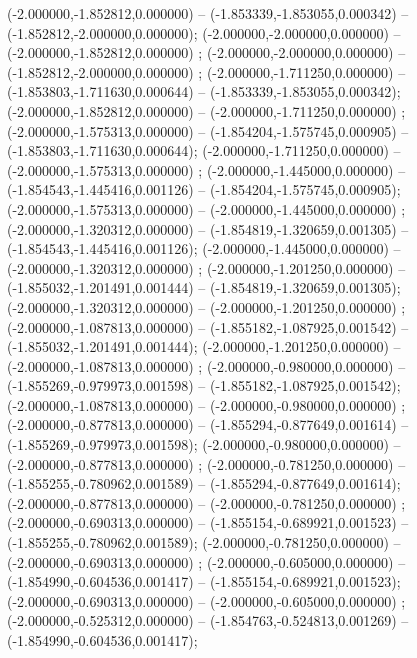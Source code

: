  (-2.000000,-1.852812,0.000000) -- (-1.853339,-1.853055,0.000342) -- (-1.852812,-2.000000,0.000000);
 (-2.000000,-2.000000,0.000000) -- (-2.000000,-1.852812,0.000000) ;
 (-2.000000,-2.000000,0.000000) -- (-1.852812,-2.000000,0.000000) ;
 (-2.000000,-1.711250,0.000000) -- (-1.853803,-1.711630,0.000644) -- (-1.853339,-1.853055,0.000342);
 (-2.000000,-1.852812,0.000000) -- (-2.000000,-1.711250,0.000000) ;
 (-2.000000,-1.575313,0.000000) -- (-1.854204,-1.575745,0.000905) -- (-1.853803,-1.711630,0.000644);
 (-2.000000,-1.711250,0.000000) -- (-2.000000,-1.575313,0.000000) ;
 (-2.000000,-1.445000,0.000000) -- (-1.854543,-1.445416,0.001126) -- (-1.854204,-1.575745,0.000905);
 (-2.000000,-1.575313,0.000000) -- (-2.000000,-1.445000,0.000000) ;
 (-2.000000,-1.320312,0.000000) -- (-1.854819,-1.320659,0.001305) -- (-1.854543,-1.445416,0.001126);
 (-2.000000,-1.445000,0.000000) -- (-2.000000,-1.320312,0.000000) ;
 (-2.000000,-1.201250,0.000000) -- (-1.855032,-1.201491,0.001444) -- (-1.854819,-1.320659,0.001305);
 (-2.000000,-1.320312,0.000000) -- (-2.000000,-1.201250,0.000000) ;
 (-2.000000,-1.087813,0.000000) -- (-1.855182,-1.087925,0.001542) -- (-1.855032,-1.201491,0.001444);
 (-2.000000,-1.201250,0.000000) -- (-2.000000,-1.087813,0.000000) ;
 (-2.000000,-0.980000,0.000000) -- (-1.855269,-0.979973,0.001598) -- (-1.855182,-1.087925,0.001542);
 (-2.000000,-1.087813,0.000000) -- (-2.000000,-0.980000,0.000000) ;
 (-2.000000,-0.877813,0.000000) -- (-1.855294,-0.877649,0.001614) -- (-1.855269,-0.979973,0.001598);
 (-2.000000,-0.980000,0.000000) -- (-2.000000,-0.877813,0.000000) ;
 (-2.000000,-0.781250,0.000000) -- (-1.855255,-0.780962,0.001589) -- (-1.855294,-0.877649,0.001614);
 (-2.000000,-0.877813,0.000000) -- (-2.000000,-0.781250,0.000000) ;
 (-2.000000,-0.690313,0.000000) -- (-1.855154,-0.689921,0.001523) -- (-1.855255,-0.780962,0.001589);
 (-2.000000,-0.781250,0.000000) -- (-2.000000,-0.690313,0.000000) ;
 (-2.000000,-0.605000,0.000000) -- (-1.854990,-0.604536,0.001417) -- (-1.855154,-0.689921,0.001523);
 (-2.000000,-0.690313,0.000000) -- (-2.000000,-0.605000,0.000000) ;
 (-2.000000,-0.525312,0.000000) -- (-1.854763,-0.524813,0.001269) -- (-1.854990,-0.604536,0.001417);
